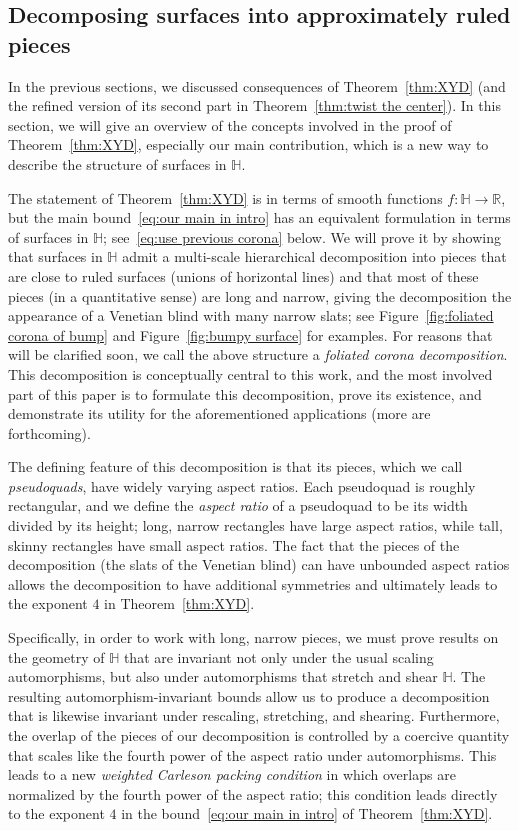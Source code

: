 \documentclass[11pt,reqno]{amsart}
\renewcommand{\H}{\mathbb{H}}
\newcommand{\R}{\mathbb{R}}
\newcommand{\0}{\mathbf{0}}
\renewcommand{\1}{\mathbf 1}
\newcommand{\from}{\colon}
\theoremstyle{remark}
\begin{document}
\subsection{Decomposing surfaces into approximately ruled pieces} \label{sec:overview} In the previous sections, we discussed consequences of Theorem~\ref{thm:XYD} (and the refined version of its second part in Theorem~\ref{thm:twist the center}).  In this section, we will give an overview of the concepts involved in the proof of Theorem~\ref{thm:XYD}, especially our main contribution, which is a new way to describe the structure of surfaces in $\H$.

The statement of Theorem~\ref{thm:XYD} is in terms of smooth functions $f\from \H\to\R$, but the main bound~\eqref{eq:our main in intro} has an equivalent formulation in terms of surfaces in $\H$; see~\eqref{eq:use previous corona} below.  We will prove it by showing that surfaces in $\H$ admit a multi-scale hierarchical decomposition into pieces that are close to ruled surfaces (unions of horizontal lines) and that most of these pieces (in a quantitative sense) are long and narrow, giving the decomposition the appearance of a Venetian blind with many narrow slats; see Figure~\ref{fig:foliated corona of bump} and Figure~\ref{fig:bumpy surface} for examples. For reasons that will be clarified soon, we call the above structure a {\em foliated corona decomposition}.  This decomposition is conceptually central to this work, and the most involved part of this paper is to formulate this decomposition, prove its existence, and demonstrate its utility for the aforementioned applications (more are forthcoming).

The defining feature of this decomposition is that its pieces, which we call \emph{pseudoquads}, have widely varying aspect ratios.  Each pseudoquad is roughly rectangular, and we define the {\em aspect ratio} of a pseudoquad to be its width divided by its height; long, narrow rectangles have large aspect ratios, while tall, skinny rectangles have small aspect ratios.  The fact that the pieces of the decomposition (the slats of the Venetian blind) can have unbounded aspect ratios allows the decomposition to have additional symmetries and ultimately leads to the exponent $4$ in Theorem~\ref{thm:XYD}.

Specifically, in order to work with long, narrow pieces, we must prove results on the geometry of $\H$ that are invariant not only under the usual scaling automorphisms, but also under automorphisms that stretch and shear $\H$.  The resulting automorphism-invariant bounds allow us to produce a decomposition that is likewise invariant under rescaling, stretching, and shearing.  Furthermore, the overlap of the pieces of our decomposition is controlled by a coercive quantity that scales like the fourth power of the aspect ratio under automorphisms.  This leads to a new {\em weighted Carleson packing condition} in which overlaps are normalized by the fourth power of the aspect ratio; this condition leads directly to the exponent $4$ in the bound~\eqref{eq:our main in intro} of Theorem~\ref{thm:XYD}.
\end{document}
